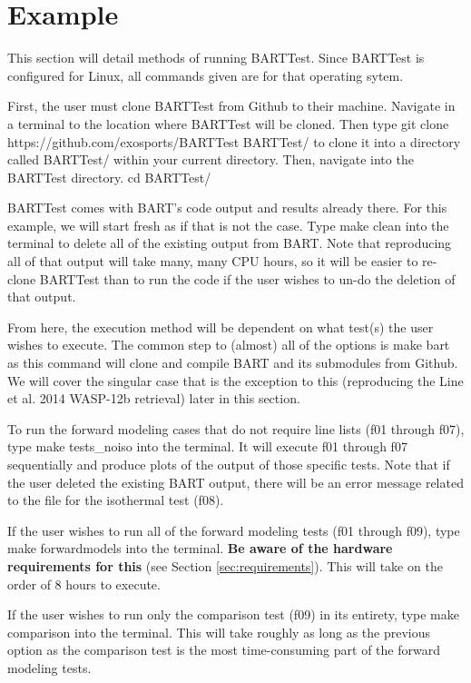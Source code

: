 \documentclass[letterpaper, 12pt]{article}
\begin{document}
\section{Example}
\label{sec:example}
This section will detail methods of running BARTTest. Since BARTTest is 
configured for Linux, all commands given are for that operating sytem.

First, the user must clone BARTTest from Github to their machine. 
Navigate in a terminal to the location where BARTTest will be cloned. 
Then type
\beginverbatim
git clone https://github.com/exosports/BARTTest BARTTest/
\endverbatim
to clone it into a directory called BARTTest/ within your current directory.
Then, navigate into the BARTTest directory.
\beginverbatim
cd BARTTest/
\endverbatim

BARTTest comes with BART's code output and results already there. For this 
example, we will start fresh as if that is not the case. Type
\beginverbatim
make clean
\endverbatim
into the terminal to delete all of the existing output from BART. Note that 
reproducing all of that output will take many, many CPU hours, so it will 
be easier to re-clone BARTTest than to run the code if the user wishes to 
un-do the deletion of that output.

From here, the execution method will be dependent on what test(s) the user 
wishes to execute. The common step to (almost) all of the options is
\beginverbatim
make bart
\endverbatim
as this command will clone and compile BART and its submodules from Github. 
We will cover the singular case that is the exception to this  
(reproducing the Line et al. 2014 WASP-12b retrieval) later in this section.

To run the forward modeling cases that do not require line lists (f01 
through f07), type
\beginverbatim
make tests_noiso
\endverbatim
into the terminal. It will execute f01 through f07 sequentially and produce 
plots of the output of those specific tests. Note that if the user deleted 
the existing BART output, there will be an error message related to the 
file for the isothermal test (f08).

If the user wishes to run all of the forward modeling tests (f01 through f09), 
type
\beginverbatim
make forwardmodels
\endverbatim
into the terminal. \textbf{Be aware of the hardware requirements for this} 
(see Section \ref{sec:requirements}). This will take on the order of 8 hours 
to execute.

If the user wishes to run only the comparison test (f09) in its entirety, type
\beginverbatim
make comparison
\endverbatim
into the terminal. This will take roughly as long as the previous option as 
the comparison test is the most time-consuming part of the forward modeling 
tests.
\end{document}
